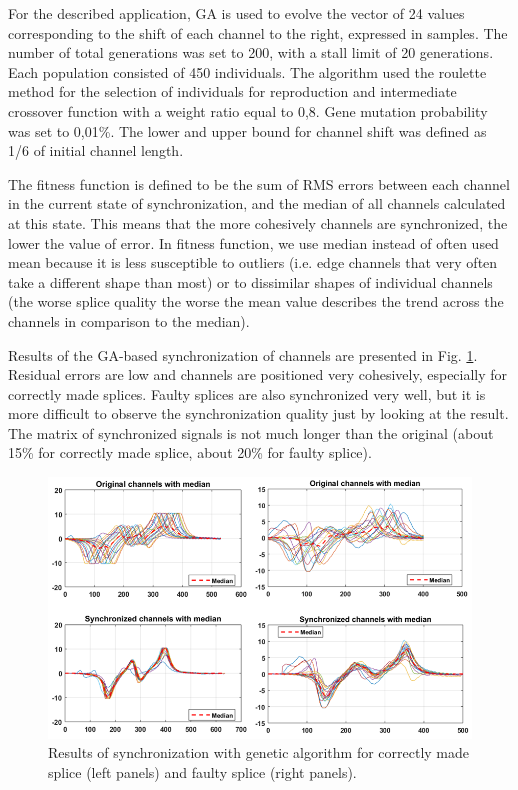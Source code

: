 \documentclass[applsci,article,preprint,moreauthors,pdftex]{Definitions/mdpi}
\begin{document}
For the described application, GA is used to evolve the vector of 24 values corresponding to the shift of each channel to the right, expressed in samples. The number of total generations was set to 200, with a stall limit of 20 generations. Each population consisted of 450 individuals. The algorithm used the roulette method for the selection of individuals for reproduction and intermediate crossover function with a weight ratio equal to 0,8. Gene mutation probability was set to 0,01\%. The lower and upper bound for channel shift was defined as 1/6 of initial channel length. 

The fitness function is defined to be the sum of RMS errors between each channel in the current state of synchronization, and the median of all channels calculated at this state. This means that the more cohesively channels are synchronized, the lower the value of error. In fitness function, we use median instead of often used mean because it is less susceptible to outliers (i.e. edge channels that very often take a different shape than most) or to dissimilar shapes of individual channels (the worse splice quality the worse the mean value describes the trend across the channels in comparison to the median).

Results of the GA-based synchronization of channels are presented in Fig. \ref{fig:gen1}. Residual errors are low and channels are positioned very cohesively, especially for correctly made splices. Faulty splices are also synchronized very well, but it is more difficult to observe the synchronization quality just by looking at the result. The matrix of synchronized signals is not much longer than the original (about 15\% for correctly made splice, about 20\% for faulty splice).

\begin{figure}[ht!]
\centering
\includegraphics[width=\textwidth]{figs/gen1.png}
\caption{Results of synchronization with genetic algorithm for correctly made splice (left panels) and faulty splice (right panels).}
\label{fig:gen1}
\end{figure}
\end{document}
